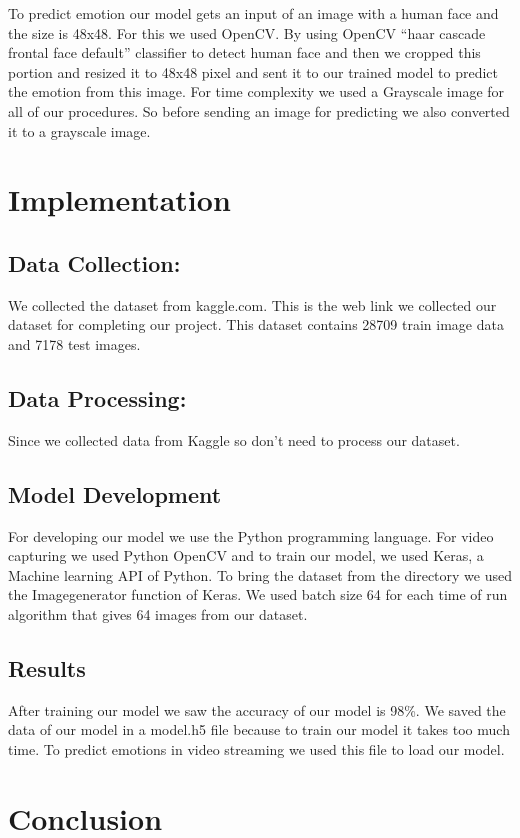 \documentclass[conference]{IEEEtran}
\begin{document}
To predict emotion our model gets an input of an image with a human face and the size is 48x48. For this we used OpenCV. By using OpenCV “haar cascade frontal face default” classifier to detect human face and then we cropped this portion and resized it to 48x48 pixel and sent it to our trained model to predict the emotion from this image. For time complexity we used a Grayscale image for all of our procedures. So before sending an image for predicting we also converted it to a grayscale image. 


\section{Implementation}
\subsection{Data Collection:}
We collected the dataset from kaggle.com. This is the web link\cite{FER2013K4:online} we collected our dataset for completing our project. This dataset contains 28709 train image data and 7178 test images. 

\subsection{Data Processing:}
Since we collected data from Kaggle so don’t need to process our dataset. 
\subsection{Model Development}
For developing our model we use the Python programming language. For video capturing we used Python OpenCV and to train our model, we used Keras, a Machine learning API of Python. To bring the dataset from the directory we used the Imagegenerator function of Keras. We used batch size 64 for each time of run algorithm that gives 64 images from our dataset. 

\subsection{Results}
After training our model we saw the accuracy of our model is 98\%. We saved the data of our model in a model.h5 file because to train our model it takes too much time. To predict emotions in video streaming we used this file to load our model. 



\section{Conclusion}
\end{document}
